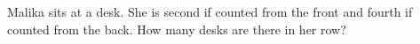 Malika sits at a desk. She is second if counted from the front and fourth if counted from the back. How many desks are there in her row?
